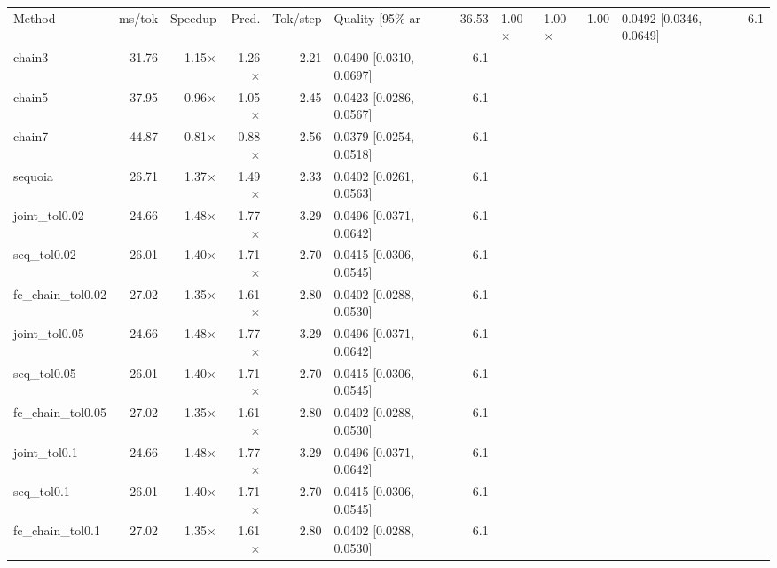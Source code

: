 \begin{tabular}{lrrrrlr}
\toprule
Method & ms/tok & Speedup & Pred. & Tok/step & Quality [95\%%
\midrule
ar & 36.53 & 1.00$\times$ & 1.00$\times$ & 1.00 & 0.0492 [0.0346, 0.0649] & 6.1 \\
chain3 & 31.76 & 1.15$\times$ & 1.26$\times$ & 2.21 & 0.0490 [0.0310, 0.0697] & 6.1 \\
chain5 & 37.95 & 0.96$\times$ & 1.05$\times$ & 2.45 & 0.0423 [0.0286, 0.0567] & 6.1 \\
chain7 & 44.87 & 0.81$\times$ & 0.88$\times$ & 2.56 & 0.0379 [0.0254, 0.0518] & 6.1 \\
sequoia & 26.71 & 1.37$\times$ & 1.49$\times$ & 2.33 & 0.0402 [0.0261, 0.0563] & 6.1 \\
joint\_tol0.02 & 24.66 & 1.48$\times$ & 1.77$\times$ & 3.29 & 0.0496 [0.0371, 0.0642] & 6.1 \\
seq\_tol0.02 & 26.01 & 1.40$\times$ & 1.71$\times$ & 2.70 & 0.0415 [0.0306, 0.0545] & 6.1 \\
fc\_chain\_tol0.02 & 27.02 & 1.35$\times$ & 1.61$\times$ & 2.80 & 0.0402 [0.0288, 0.0530] & 6.1 \\
joint\_tol0.05 & 24.66 & 1.48$\times$ & 1.77$\times$ & 3.29 & 0.0496 [0.0371, 0.0642] & 6.1 \\
seq\_tol0.05 & 26.01 & 1.40$\times$ & 1.71$\times$ & 2.70 & 0.0415 [0.0306, 0.0545] & 6.1 \\
fc\_chain\_tol0.05 & 27.02 & 1.35$\times$ & 1.61$\times$ & 2.80 & 0.0402 [0.0288, 0.0530] & 6.1 \\
joint\_tol0.1 & 24.66 & 1.48$\times$ & 1.77$\times$ & 3.29 & 0.0496 [0.0371, 0.0642] & 6.1 \\
seq\_tol0.1 & 26.01 & 1.40$\times$ & 1.71$\times$ & 2.70 & 0.0415 [0.0306, 0.0545] & 6.1 \\
fc\_chain\_tol0.1 & 27.02 & 1.35$\times$ & 1.61$\times$ & 2.80 & 0.0402 [0.0288, 0.0530] & 6.1 \\
\bottomrule
\end{tabular}
